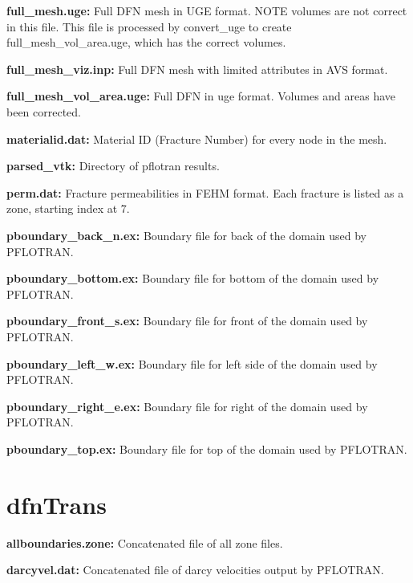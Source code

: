 \documentclass[letterpaper,10pt,english]{sphinxmanual}
\begin{document}
\textbf{full\_mesh.uge:}
\label{output:full-mesh-uge}
Full DFN mesh in UGE format. NOTE volumes are not correct in this file. This file is processed by convert\_uge to create full\_mesh\_vol\_area.uge, which has the correct volumes.

\textbf{full\_mesh\_viz.inp:}
\label{output:full-mesh-viz-inp}
Full DFN mesh with limited attributes in AVS format.

\textbf{full\_mesh\_vol\_area.uge:}
\label{output:full-mesh-vol-area-uge}
Full DFN in uge format. Volumes and areas have been corrected.

\textbf{materialid.dat:}
\label{output:materialid-dat}
Material ID (Fracture Number) for every node in the mesh.

\textbf{parsed\_vtk:}
\label{output:parsed-vtk}
Directory of pflotran results.

\textbf{perm.dat:}
\label{output:perm-dat}
Fracture permeabilities in FEHM format. Each fracture is listed as a zone, starting index at 7.

\textbf{pboundary\_back\_n.ex:}
\label{output:pboundary-back-n-ex}
Boundary file for back of the domain used by PFLOTRAN.

\textbf{pboundary\_bottom.ex:}
\label{output:pboundary-bottom-ex}
Boundary file for bottom of the domain used by PFLOTRAN.

\textbf{pboundary\_front\_s.ex:}
\label{output:pboundary-front-s-ex}
Boundary file for front of the domain used by PFLOTRAN.

\textbf{pboundary\_left\_w.ex:}
\label{output:pboundary-left-w-ex}
Boundary file for left side of the domain used by PFLOTRAN.

\textbf{pboundary\_right\_e.ex:}
\label{output:pboundary-right-e-ex}
Boundary file for right of the domain used by PFLOTRAN.

\textbf{pboundary\_top.ex:}
\label{output:pboundary-top-ex}
Boundary file for top of the domain used by PFLOTRAN.


\section{dfnTrans}
\label{output:dfntrans}
\textbf{allboundaries.zone:}
\label{output:allboundaries-zone}
Concatenated file of all zone files.

\textbf{darcyvel.dat:}
\label{output:darcyvel-dat}
Concatenated file of darcy velocities output by PFLOTRAN.
\end{document}
